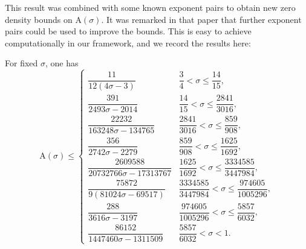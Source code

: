 \documentclass[a4paper, 10pt]{amsart}
\newcommand{\A}{\mathrm{A}}
\begin{document}
This result was combined with some known exponent pairs to obtain new zero density bounds on $\A(\sigma)$.
It was remarked in that paper that further exponent pairs could be used to improve the bounds.  This is easy to achieve computationally in our framework, and we record the results here:

\begin{theorem}\label{bourgain-zero-density-optimized} For fixed $\sigma$, one has
    \[
    \A(\sigma) \leq \begin{cases}
\dfrac{11}{12(4 \sigma - 3)} & \dfrac{3}{4} < \sigma \le \dfrac{14}{15},\\
\dfrac{391}{2493 \sigma - 2014} & \dfrac{14}{15} < \sigma \le \dfrac{2841}{3016},\\
\dfrac{22232}{163248 \sigma - 134765} & \dfrac{2841}{3016} < \sigma \le \dfrac{859}{908},\\
\dfrac{356}{2742 \sigma - 2279} & \dfrac{859}{908} < \sigma \le \dfrac{1625}{1692},\\
\dfrac{2609588}{20732766\sigma - 17313767} & \dfrac{1625}{1692} < \sigma \le \dfrac{3334585}{3447984},\\
\dfrac{75872}{9 (81024 \sigma - 69517)} & \dfrac{3334585}{3447984} < \sigma \le \dfrac{974605}{1005296},\\
\dfrac{288}{3616 \sigma - 3197} & \dfrac{974605}{1005296} < \sigma \le \dfrac{5857}{6032},\\
\dfrac{86152}{1447460 \sigma - 1311509} & \dfrac{5857}{6032} < \sigma < 1.
\end{cases}
    \]
\end{theorem}
\end{document}
